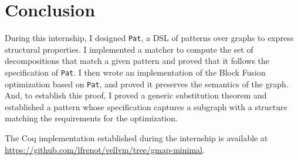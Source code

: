 \documentclass[11pt]{article}
\newcommand{\pat}{\texttt{Pat}\xspace}
\begin{document}


\section{Conclusion}
\label{sec:ccl}

During this internship, I designed \pat, a DSL of patterns over graphs to express structural properties. I implemented a matcher to compute the set of decompositions that match a given pattern and proved that it follows the specification of \pat.
I then wrote an implementation of the Block Fusion optimization based on \pat, and proved it preserves the semantics of the graph. And, to establish this proof, I proved a generic substitution theorem and established a pattern whose specification captures a subgraph with a structure matching the requirements for the optimization.

The Coq implementation established during the internship is available at \url{https://github.com/lfrenot/vellvm/tree/gmap-minimal}.

\printbibliography
\end{document}
